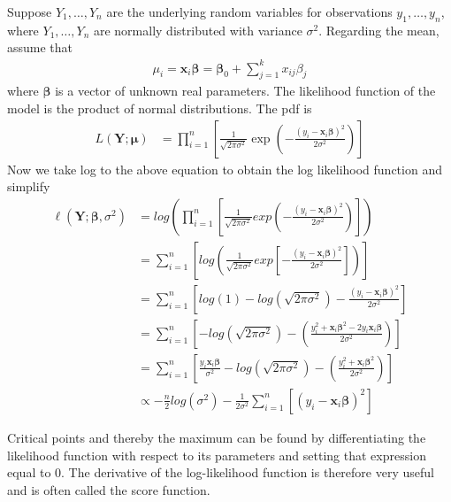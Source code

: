 \begin{example} \label{ex:model1}
Suppose $Y_1,\ldots,Y_n$ are the underlying random variables for observations $y_1,\ldots,y_n$, where $Y_1,\ldots,Y_n$ are normally distributed with variance $\sigma^2$. Regarding the mean, assume that
\begin{align*}
    \mu_i = \textbf{x}_i\boldsymbol{\beta}= \boldsymbol{\beta}_0 + \sum_{j=1}^k x_{ij}\beta_j
\end{align*}
where $\boldsymbol{\beta}$ is a vector of unknown real parameters. 
The likelihood function of the model is the product of normal distributions. The pdf is 
\begin{align*}
   L(\textbf{Y};\boldsymbol{\mu}) &= \prod_{i=1}^n \left[ \frac{1}{ \sqrt{2 \pi\sigma^2}}\exp\left(-\frac{(y_i -\textbf{x}_i\boldsymbol{\beta})^2}{2\sigma^2}\right) \right]
\end{align*}
Now we take log to the above equation to obtain the log likelihood function and simplify
\begin{align*}
   \ell(\textbf{Y};\boldsymbol{\beta}, \sigma^2) &= log \left( \prod_{i=1}^n \left[ \frac{1}{\sqrt{2 \pi \sigma^2}}exp\left(-\frac{(y_i -\textbf{x}_i\boldsymbol{\beta})^2}{2\sigma^2}\right) \right] \right)\\
   &= \sum_{i = 1}^n \left[ log\left( \frac{1}{\sqrt{2 \pi \sigma^2}}exp\left[-\frac{(y_i - \textbf{x}_i\boldsymbol{\beta})^2}{2\sigma^2}\right] \right) \right]\\
   &= \sum_{i = 1}^n \left[ log(1) - log(\sqrt{2 \pi \sigma^2}) - \frac{(y_i - \textbf{x}_i\boldsymbol{\beta})^2}{2\sigma^2} \right]\\
   &= \sum_{i = 1}^n \left[- log\left( \sqrt{2 \pi \sigma^2}\right) - \left(\frac{y_i^2 + \textbf{x}_i\boldsymbol{\beta}^2 - 2y_i\textbf{x}_i\boldsymbol{\beta}}{2 \sigma^2}\right) \right]\\
   &= \sum_{i = 1}^n \left[\frac{y_i \textbf{x}_i\boldsymbol{\beta}}{\sigma^2} - log\left( \sqrt{2 \pi \sigma^2}\right) - \left( \frac{y_i^2 + \textbf{x}_i\boldsymbol{\beta}^2}{2\sigma^2} \right) \right] \\
   &\propto - \frac{n}{2}log( \sigma^2) - \frac{1}{2\sigma^2} \sum_{i = 1}^n \left[(y_i -\textbf{x}_i\boldsymbol{\beta})^2  \right]
\end{align*}
\end{example}
Critical points and thereby the maximum can be found by differentiating the likelihood function with respect to its parameters and setting that expression equal to 0. 
The derivative of the log-likelihood function is therefore very useful and is often called the score function. 

